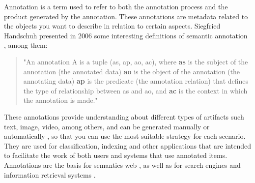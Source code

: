 
Annotation is a term used to refer to both the annotation process and the product generated by the annotation. These annotations are metadata related to the objects you want to describe in relation to certain aspects. Siegfried Handschuh presented in 2006 some interesting definitions of semantic annotation \cite{oren2006semantic}, among them:

\begin{quote}
"An annotation A is a tuple (as, ap, ao, ac), where \textbf{as} is the subject of the annotation (the annotated data) \textbf{ao} is the object of the annotation (the annotating data) \textbf{ap} is the predicate (the annotation relation) that defines the type of relationship between as and ao, and \textbf{ac} is the context in which the annotation is made."
\end{quote}

These annotations  provide understanding about different types of artifacts \cite{Singhal:2014:GSA:2611040.2611056} such text, image, video, among others, and can be generated manually or automatically \cite{Mihalcea:2007:WLD:1321440.1321475}, so that you can use the most suitable strategy for each scenario. They are used for classification, indexing and other applications that are intended to facilitate the work of both users and systems that use annotated items. Annotations are the basis for semantics web \cite{Cimiano:2004:TSW:988672.988735}, as well as for search engines and information retrieval systems \cite{Datta:2008:IRI:1348246.1348248,Junior:2008:MMS:1809980.1810011,Dmitriev:2006:UAE:1135777.1135900}. 





